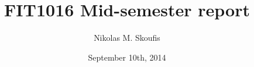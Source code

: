 \documentclass[a4paper,12pt]{article}
\begin{document}
\title{FIT1016 Mid-semester report}
\author{Nikolas M. Skoufis}
\date{September 10th, 2014}

\maketitle
\end{document}
